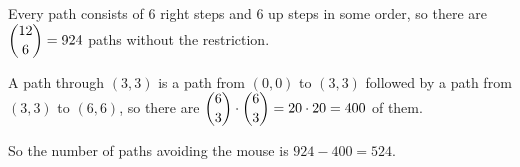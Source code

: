 Every path consists of $6$ right steps and $6$ up steps in some order, so there are $\dbinom{12}{6}=924$ paths without the restriction.

A path through $(3,3)$ is a path from $(0,0)$ to $(3,3)$ followed by a path from $(3,3)$ to $(6,6)$, so there are $\dbinom63\cdot\dbinom63=20\cdot20=400$ of them.

So the number of paths avoiding the mouse is $924-400=\boxed{524}$.
